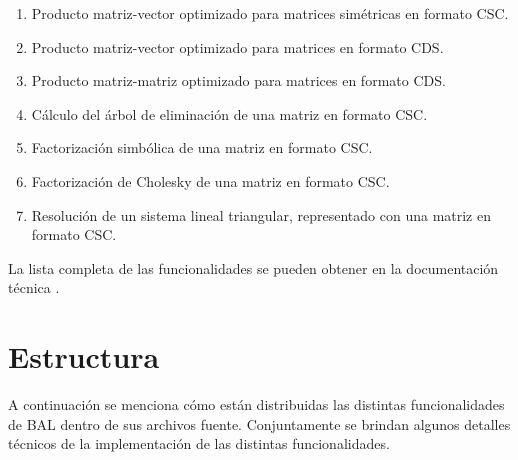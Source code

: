 \documentclass[a4paper,10pt]{article}
\begin{document}
\begin{enumerate}
\begin{enumerate}
  \item Producto matriz-vector optimizado para matrices simétricas en formato CSC.
  \item Producto matriz-vector optimizado para matrices en formato CDS.
  \item Producto matriz-matriz optimizado para matrices en formato CDS.
  \item Cálculo del árbol de eliminación \cite{Liu} de una matriz en formato CSC.
  \item Factorización simbólica de una matriz en formato CSC.
  \item Factorización de Cholesky de una matriz en formato CSC.
  \item Resolución de un sistema lineal triangular, representado con una matriz en formato CSC.
 \end{enumerate}
\end{enumerate}
La lista completa de las funcionalidades se pueden obtener en la documentación técnica \cite{bal_tecnica}.

\section{Estructura}
\label{sec_estructura}
A continuación se menciona cómo están distribuidas las distintas funcionalidades de BAL dentro de sus archivos fuente. Conjuntamente se brindan algunos detalles técnicos de la implementación de las distintas funcionalidades.
\end{document}
